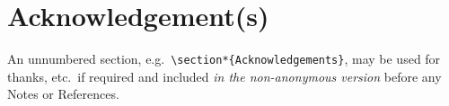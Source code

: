 \documentclass[]{interact}
\theoremstyle{plain}%
\theoremstyle{definition}
\theoremstyle{remark}
\begin{document}







\section*{Acknowledgement(s)}

An unnumbered section, e.g.\ \verb"\section*{Acknowledgements}", may be used for thanks, etc.\ if required and included \emph{in the non-anonymous version} before any Notes or References.






\bigskip
\end{document}
